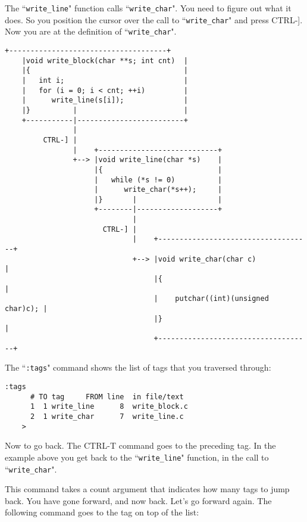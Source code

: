 The ``\texttt{write\_line}" function calls ``\texttt{write\_char}".
You need to figure out what it does.
So you position the cursor over the call to ``\texttt{write\_char}" and press CTRL-].
Now you are at the definition of ``\texttt{write\_char}".

\begin{Verbatim}[samepage=true]
    +-------------------------------------+
    |void write_block(char **s; int cnt)  |
    |{                                    |
    |   int i;                            |
    |   for (i = 0; i < cnt; ++i)         |
    |      write_line(s[i]);              |
    |}          |                         |
    +-----------|-------------------------+
                |
         CTRL-] |
                |    +----------------------------+
                +--> |void write_line(char *s)    |
                     |{                           |
                     |   while (*s != 0)          |
                     |      write_char(*s++);     |
                     |}       |                   |
                     +--------|-------------------+
                              |
                       CTRL-] |
                              |    +------------------------------------+
                              +--> |void write_char(char c)             |
                                   |{                                   |
                                   |    putchar((int)(unsigned char)c); |
                                   |}                                   |
                                   +------------------------------------+
\end{Verbatim}

The ``\texttt{:tags}" command shows the list of tags that you traversed through:

\begin{Verbatim}[samepage=true]
    :tags
      # TO tag     FROM line  in file/text 
      1  1 write_line      8  write_block.c 
      2  1 write_char      7  write_line.c 
    > 
\end{Verbatim}

Now to go back.
The CTRL-T command goes to the preceding tag.
In the example above you get back to the ``\texttt{write\_line}" function, in the call to ``\texttt{write\_char}".

This command takes a count argument that indicates how many tags to jump back.
You have gone forward, and now back.
Let's go forward again.
The following command goes to the tag on top of the list:

